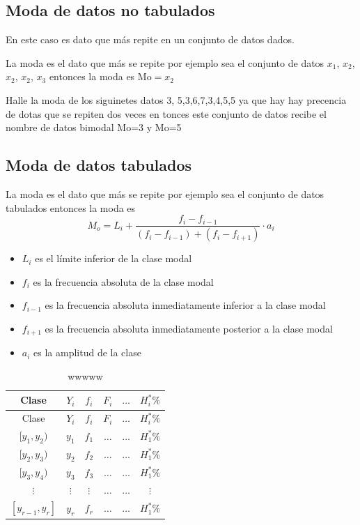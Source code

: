 \documentclass[10pt,]{krantz}
\theoremstyle{definition}
\theoremstyle{definition}
\theoremstyle{definition}
\theoremstyle{definition}
\theoremstyle{remark}
\begin{document}
\hypertarget{moda-de-datos-no-tabulados}{%
\subsection{Moda de datos no tabulados}\label{moda-de-datos-no-tabulados}}

En este caso es dato que más repite en un conjunto de datos dados.

La moda es el dato que más se repite por ejemplo sea el conjunto de datos \(x_1\), \(x_2\), \(x_2\), \(x_2\), \(x_3\) entonces la moda es \(\text{Mo}=x_2\)

Halle la moda de los siguinetes datos 3, 5,3,6,7,3,4,5,5 ya que hay hay precencia de dotas que se repiten dos veces en tonces este conjunto de datos recibe el nombre de datos bimodal Mo=3 y Mo=5

\hypertarget{moda-de-datos-tabulados}{%
\subsection{Moda de datos tabulados}\label{moda-de-datos-tabulados}}

La moda es el dato que más se repite por ejemplo sea el conjunto de datos tabulados entonces la moda es \[ M_o=L_i+\frac{f_i-f_{i-1}}{(f_i-f_{i-1})+(f_i-f_{i+1})}\cdot a_i\]

\begin{itemize}
\item
  \(L_i\) es el límite inferior de la clase modal
\item
  \(f_i\) es la frecuencia absoluta de la clase modal
\item
  \(f_{i-1}\) es la frecuencia absoluta inmediatamente inferior a la clase modal
\item
  \(f_{i+1}\) es la frecuencia absoluta inmediatamente posterior a la clase modal
\item
  \(a_i\) es la amplitud de la clase
\end{itemize}

\begin{longtable}[]{@{}cccccc@{}}
\caption{\label{tab:wwwww} wwwww}\tabularnewline
\toprule
Clase & \(Y_i\) & \(f_i\) & \(F_i\) & \(\ldots\) & \(H_i^*\%\)\tabularnewline
\midrule
\endfirsthead
\toprule
Clase & \(Y_i\) & \(f_i\) & \(F_i\) & \(\ldots\) & \(H_i^*\%\)\tabularnewline
\midrule
\endhead
\([y_1,y_2)\) & \(y_1\) & \(f_1\) & \(\ldots\) & \(\ldots\) & \(H_1^*\%\)\tabularnewline
\([y_2,y_3)\) & \(y_2\) & \(f_2\) & \(\ldots\) & \(\ldots\) & \(H_1^*\%\)\tabularnewline
\([y_3,y_4)\) & \(y_3\) & \(f_3\) & \(\ldots\) & \(\ldots\) & \(H_1^*\%\)\tabularnewline
\(\vdots\) & \(\vdots\) & \(\vdots\) & \(\ldots\) & \(\ldots\) & \(\vdots\)\tabularnewline
\([y_{r-1},y_r]\) & \(y_r\) & \(f_r\) & \(\ldots\) & \(\ldots\) & \(H_1^*\%\)\tabularnewline
\bottomrule
\end{longtable}
\end{document}
